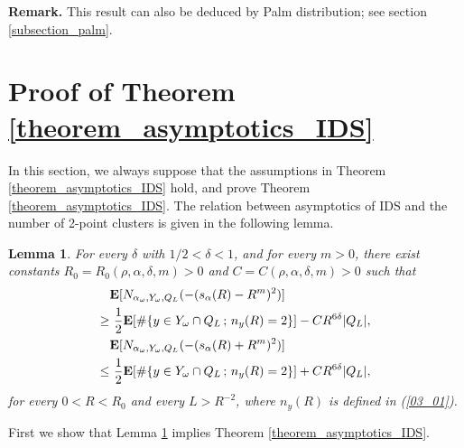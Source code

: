 \documentclass[12pt,a4paper]{article}
\newtheorem{lemma}[theorem]{Lemma}
\begin{document}
\noindent
{\bf Remark.}
This result can also be deduced by Palm distribution;
see section \ref{subsection_palm}.

\section{Proof of Theorem \ref{theorem_asymptotics_IDS}}
In this section, 
we always suppose that the assumptions in 
Theorem \ref{theorem_asymptotics_IDS} hold,
and prove Theorem \ref{theorem_asymptotics_IDS}.
The relation between asymptotics of IDS
and the number of 2-point clusters
is given in the following lemma.
\begin{lemma}
\label{lemma_ids-est}
 For every $\delta$ with $1/2<\delta <1$,
and for every $m>0$,
there exist constants $R_0=R_0(\rho,\alpha,\delta,m)>0$
and $C=C(\rho,\alpha,\delta,m)>0$
such that
\begin{align}
& \mathbf{E}[N_{\alpha_\omega,Y_\omega,Q_L}(-(s_\alpha(R)-R^m)^2)]\notag\\
\geq&\  \frac{1}{2}
\mathbf{E}[
\#\{y\in Y_\omega\cap Q_L\,;\, n_y(R)=2\}]
-
C R^{6\delta}|Q_L|,
\label{04_01}
\\
& \mathbf{E}[N_{\alpha_\omega,Y_\omega,Q_L}(-(s_\alpha(R)+R^m)^2)]\notag\\
\leq&\  \frac{1}{2}
\mathbf{E}[
\#\{y\in Y_\omega\cap Q_L\,;\, n_y(R)=2\}]
+
C R^{6\delta}|Q_L|,
\label{04_02}
\end{align}
for every $0<R<R_0$ and every $L>R^{-2}$,
where $n_y(R)$ is defined in (\ref{03_01}).
\end{lemma}

First we show that Lemma \ref{lemma_ids-est} implies
Theorem \ref{theorem_asymptotics_IDS}.
\end{document}
